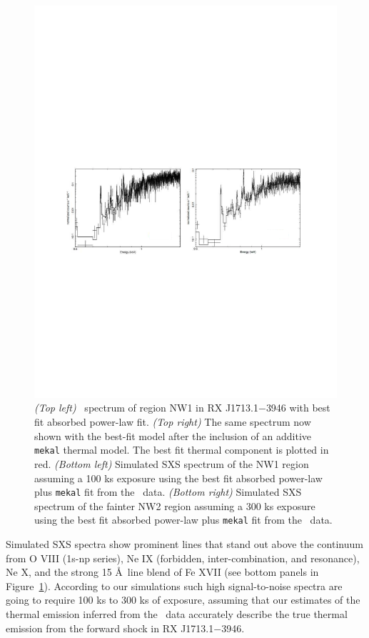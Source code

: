 \documentclass[11pt,a4paper]{article}
\begin{document}
{\begin{figure}[h]
\begin{center}
\includegraphics[width=5.5in,clip,trim=56 290 72 320]{RXJ1713_spectra2}
\normalsize
\caption{{\it (Top left)} \chandra\ spectrum of region NW1 in RX
  J1713.1$-$3946 with best fit absorbed power-law fit.  {\it (Top
    right)} The same spectrum now shown with the best-fit model after
  the inclusion of an additive {\tt mekal}  thermal model.  The best fit
  thermal component is plotted in red.  {\it (Bottom left)} Simulated
  SXS spectrum of the NW1 region assuming a 100 ks exposure using the
  best fit absorbed power-law plus {\tt mekal}  fit from the \chandra\ data.
  {\it (Bottom right)} Simulated SXS spectrum of the fainter NW2
  region assuming a 300 ks exposure using the best fit absorbed
  power-law plus {\tt mekal}  fit from the \chandra\ data.}
\label{fig:rxjspectra}
\end{center}
\end{figure}

Simulated SXS spectra show prominent lines that stand out above the
continuum from O VIII (1s-np series), Ne IX (forbidden,
inter-combination, and resonance), Ne X, and the strong 15 \AA\ line
blend of Fe XVII (see bottom panels in Figure~\ref{fig:rxjspectra}).
According to our simulations such high signal-to-noise spectra are
going to require 100 ks to 300 ks of exposure, assuming that our
estimates of the thermal emission inferred from the \chandra\ data 
accurately describe the true thermal emission from the forward shock in 
RX J1713.1$-$3946.

}
\end{document}
